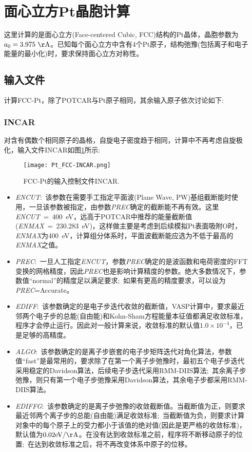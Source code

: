 \section{面心立方Pt晶胞计算}\label{Sec:FCC-Pt}
这里计算的是面心立方\textrm{(Face-centered Cubic, FCC)}结构的\textrm{Pt}晶体，晶胞参数为$a_0=3.975~\mathrm{\AA}$。已知每个面心立方中含有4个\textrm{Pt}原子，结构弛豫(包括离子和电子能量的最小化)时，要求保持面心立方对称性。
\subsection{输入文件}
计算\textrm{FCC-Pt}，除了\textrm{POTCAR}与\textrm{Pt}原子相同，其余输入原子依次讨论如下:~
\subsubsection{\rm{INCAR}}
对含有偶数个相同原子的晶格，自旋电子密度趋于相同，计算中不再考虑自旋极化，输入文件\textrm{INCAR}如图\ref{Pt_FCC:INCAR}所示:
\begin{figure}[h!]
\centering
\texttt{[image: Pt\_FCC-INCAR.png]}
\caption{\small \textrm{FCC-Pt}的输入控制文件\textrm{INCAR}.}%
\label{Pt_FCC:INCAR}
\end{figure}
\begin{itemize}
	\item \textit{ENCUT}:~该参数在需要手工指定平面波\textrm{(Plane Wave, PW)}基组截断能时使用，一旦该参数被指定，由参数\textit{PREC}确定的截断能不再有效。这里\textit{ENCUT}~=~400\textrm{~eV}，远高于\textrm{POTCAR}中推荐的能量截断值(\textit{ENMAX}~=~230.283\textrm{~eV})，这样做主要是考虑到后续模拟\textrm{Pt}表面吸附\textrm{O}时，\textit{ENMAX}为400\textrm{~eV}，计算组分体系时，平面波截断能应选为不低于最高的\textit{ENMAX}之值。
	\item \textit{PREC}:~一旦人工指定\textit{ENCUT}，参数\textit{PREC}确定的是波函数和电荷密度的\textrm{FFT}变换的网格精度，因此\textit{PREC}也是影响计算精度的参数。绝大多数情况下，参数值\textrm{``normal''}的精度足以满足要求;~如果有更高的精度要求，可以设为\textit{PREC}=\textrm{Accurate}。
	\item \textit{EDIFF}:~该参数确定的是电子步迭代收敛的截断值，\textrm{VASP}计算中，要求最近邻两个电子步的总能(自由能)和\textrm{Kohn-Sham}方程能量本征值都满足收敛标准，程序才会停止运行。因此对一般计算来说，收敛标准的默认值$1.0\times10^{-4}$，已是足够的高精度。
	\item \textit{ALGO}:~该参数确定的是离子步嵌套的电子步矩阵迭代对角化算法，参数值\textrm{``fast''}是最常用的，要求除了在第一个离子步弛豫时，最初五个电子步迭代采用稳定的\textrm{Davidson}算法，后续电子步迭代采用\textrm{RMM-DIIS}算法;~其余离子步弛豫，则只有第一个电子步弛豫采用\textrm{Davidson}算法，其余电子步都采用\textrm{RMM-DIIS}算法。
	\item \textit{EDIFFG}:~该参数确定的是离子步弛豫的收敛截断值。当截断值为正，则要求最近邻两个离子步的总能(自由能)满足收敛标准;~当截断值为负，则要求计算对象中的每个原子上的受力都小于该值的绝对值(因此是更严格的收敛标准)，默认值为$0.02\mathrm{eV/\AA}$。在没有达到收敛标准之前，程序将不断移动原子的位置;~在达到收敛标准之后，将不再改变体系中原子的位移。
\end{itemize}
